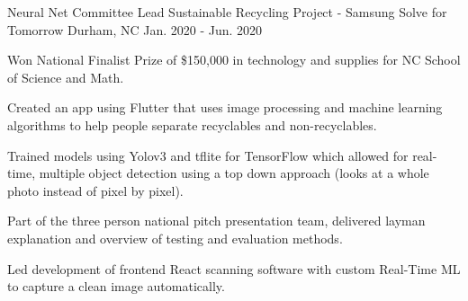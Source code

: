 

\begin{cventries}

  \cventry
    {Neural Net Committee Lead} %
    {Sustainable Recycling Project - Samsung Solve for Tomorrow} %
    {Durham, NC} %
    {Jan. 2020 - Jun. 2020} %
    {
      \begin{cvitems} %
        \item {Won National Finalist Prize of \$150,000 in technology and supplies for NC School of Science and Math.}
        \item {Created an app using Flutter that uses image processing and machine learning algorithms to help people separate recyclables and non-recyclables.}
        \item {Trained models using Yolov3 and tflite for TensorFlow which allowed for real-time, multiple object detection using a top down approach (looks at a whole photo instead of pixel by pixel).}
        \item {Part of the three person national pitch presentation team, delivered layman explanation and overview of testing and evaluation methods.}
        \item {Led development of frontend React scanning software with custom Real-Time ML to capture a clean image automatically.}
      \end{cvitems}
    }

\end{cventries}


